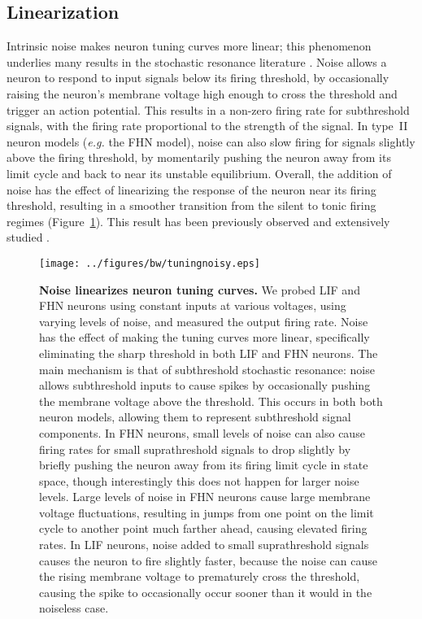 \documentclass[12pt]{article}
\begin{document}
\subsection{Linearization}

Intrinsic noise makes neuron tuning curves more linear;
this phenomenon underlies many results in the stochastic resonance literature
\citep{Chialvo1997}.
Noise allows a neuron to respond to input signals below its firing threshold,
by occasionally raising the neuron's membrane voltage high enough
to cross the threshold and trigger an action potential.
This results in a non-zero firing rate for subthreshold signals,
with the firing rate proportional to the strength of the signal.
In type~II neuron models (\emph{e.g.} the FHN model),
noise can also slow firing for signals slightly above the firing threshold,
by momentarily pushing the neuron away from its limit cycle and back to near its unstable equilibrium.
Overall, the addition of noise has the effect
of linearizing the response of the neuron near its firing threshold,
resulting in a smoother transition from the silent to tonic firing regimes (Figure~\ref{fig:tuning}).
This result has been previously observed and extensively studied \citep{Stocks1996,Chialvo1997,Chance2002,Prescott2002,Shu2003}.

\begin{figure}
  \ifx\hidefigures\undefined
    \centering
    \texttt{[image: ../figures/bw/tuningnoisy.eps]}
  \fi
  \caption{
    \textbf{Noise linearizes neuron tuning curves.} We probed LIF and FHN neurons using constant inputs at various voltages, using varying levels of noise, and measured the output firing rate. Noise has the effect of making the tuning curves more linear, specifically eliminating the sharp threshold in both LIF and FHN neurons. The main mechanism is that of subthreshold stochastic resonance: noise allows subthreshold inputs to cause spikes by occasionally pushing the membrane voltage above the threshold. This occurs in both both neuron models, allowing them to represent subthreshold signal components. In FHN neurons, small levels of noise can also cause firing rates for small suprathreshold signals to drop slightly by briefly pushing the neuron away from its firing limit cycle in state space, though interestingly this does not happen for larger noise levels. Large levels of noise in FHN neurons cause large membrane voltage fluctuations, resulting in jumps from one point on the limit cycle to another point much farther ahead, causing elevated firing rates. In LIF neurons, noise added to small suprathreshold signals causes the neuron to fire slightly faster, because the noise can cause the rising membrane voltage to prematurely cross the threshold, causing the spike to occasionally occur sooner than it would in the noiseless case.
  }
  \label{fig:tuning}
\end{figure}
\end{document}
